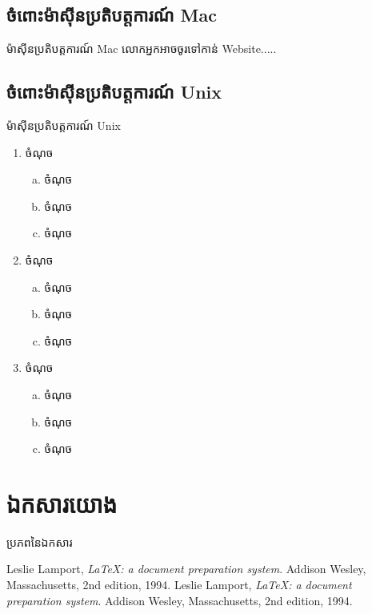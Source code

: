 \documentclass{beamer}
\begin{document}
	\subsection{ចំពោះម៉ាស៊ីនប្រតិបត្តការណ៍ Mac}
		\begin{frame}{ម៉ាស៊ីនប្រតិបត្តការណ៍ Mac}
			លោកអ្នកអាចចូរទៅកាន់ Website​.....
		\end{frame}
	\subsection{ចំពោះម៉ាស៊ីនប្រតិបត្តការណ៍ Unix}
		\begin{frame}{ម៉ាស៊ីនប្រតិបត្តការណ៍ Unix}
			\begin{enumerate}
				\item ចំណុច
			\begin{enumerate}[a)]
				\item ចំណុច
				\item ចំណុច
				\item ចំណុច
			\end{enumerate}
			\item ចំណុច
			\begin{enumerate}[a)]
				\item ចំណុច
				\item ចំណុច
				\item ចំណុច
			\end{enumerate}
			\item ចំណុច
			\begin{enumerate}[a)]
				\item ចំណុច
				\item ចំណុច
				\item ចំណុច
			\end{enumerate}
		\end{enumerate}
	\end{frame}
	\section{ឯកសារយោង}
	\begin{frame}{ប្រភពនៃឯកសារ}
		\begin{thebibliography}{4}
			Leslie Lamport,
			\emph{\LaTeX: a document preparation system}.
			Addison Wesley, Massachusetts,
			2nd edition,
			1994.
			Leslie Lamport,
			\emph{\LaTeX: a document preparation system}.
			Addison Wesley, Massachusetts,
			2nd edition,
			1994.
		\end{thebibliography}
	\end{frame}
\end{document}
